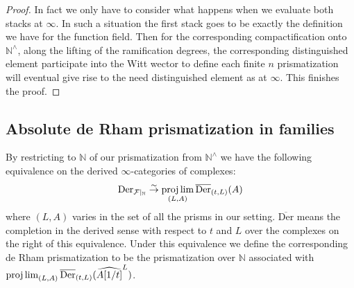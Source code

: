 \documentclass[12pt]{article}
\theoremstyle{definition}
\begin{document}
\begin{proof}
In fact we only have to consider what happens when we evaluate both stacks at $\infty$. In such a situation the first stack goes to be exactly the definition we have for the function field. Then for the corresponding compactification onto $\mathbb{N}^\wedge$, along the lifting of the ramification degrees, the corresponding distinguished element participate into the Witt wector to define each finite $n$ prismatization will eventual give rise to the need distinguished element as at $\infty$. This finishes the proof.
\end{proof}





\subsection{Absolute de Rham prismatization in families}



By restricting to $\mathbb{N}$ of our prismatization from $\mathbb{N}^\wedge$ we have the following equivalence on the derived $\infty$-categories of complexes:
\begin{align}
\mathrm{Der}_{\mathcal{F}|_{\mathbb{N}}}\overset{\sim}{\rightarrow} \projlim_{(L,A)}\overline{\mathrm{Der}}_{(t,L)}(A)
\end{align}
where $(L,A)$ varies in the set of all the prisms in our setting. $\overline{\mathrm{Der}}$ means the completion in the derived sense with respect to $t$ and $L$ over the complexes on the right of this equivalence. Under this equivalence we define the corresponding de Rham prismatization to be the prismatization over $\mathbb{N}$ associated with $\projlim_{(L,A)}\overline{\mathrm{Der}}_{(t,L)}(\widehat{A[1/t]}^{L})$.
\end{document}
